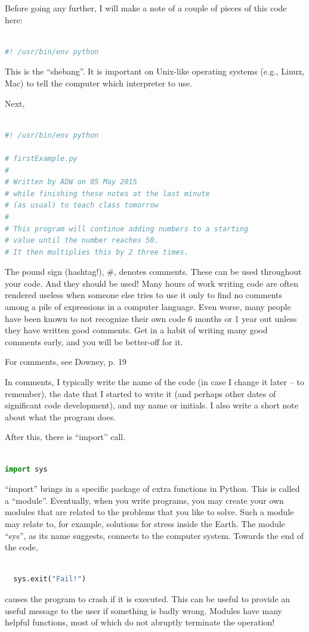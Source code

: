 \documentclass[a4paper,10pt]{scrartcl}
\begin{document}
Before going any further, I will make a note of a couple of pieces of this code here:
\begin{lstlisting}[belowskip=-1.6\baselineskip, language=python]

#! /usr/bin/env python
\end{lstlisting}
This is the ``shebang''. It is important on Unix-like operating systems (e.g., Linux, Mac) to tell the computer which interpreter to use.

Next,
\begin{lstlisting}[belowskip=-1.6\baselineskip, language=python]

#! /usr/bin/env python

# firstExample.py
# 
# Written by ADW on 05 May 2015
# while finishing these notes at the last minute
# (as usual) to teach class tomorrow
# 
# This program will continue adding numbers to a starting
# value until the number reaches 50.
# It then multiplies this by 2 three times.
\end{lstlisting}
The pound sign (hashtag!), \#, denotes comments. These can be used throughout your code. And they should be used! Many hours of work writing code are often rendered useless when someone else tries to use it only to find no comments among a pile of expressions in a computer language. Even worse, many people have been known to not recognize their own code 6 months or 1 year out unless they have written good comments. Get in a habit of writing many good comments early, and you will be better-off for it.

\begin{framed}
For comments, see Downey, p. 19
\end{framed}

In comments, I typically write the name of the code (in case I change it later -- to remember), the date that I started to write it (and perhaps other dates of significant code development), and my name or initials. I also write a short note about what the program does.

After this, there is ``import'' call.
\begin{lstlisting}[belowskip=-1.6\baselineskip, language=python]

import sys
\end{lstlisting}
``import'' brings in a specific package of extra functions in Python. This is called a ``module''. Eventually, when you write programs, you may create your own modules that are related to the problems that you like to solve. Such a module may relate to, for example, solutions for stress inside the Earth. The module ``sys'', as its name suggests, connects to the computer system. Towards the end of the code,
\begin{lstlisting}[belowskip=-1.6\baselineskip, language=python]

  sys.exit("Fail!")
\end{lstlisting}
causes the program to crash if it is executed. This can be useful to provide an useful message to the user if something is badly wrong. Modules have many helpful functions, most of which do not abruptly terminate the operation!
\end{document}
